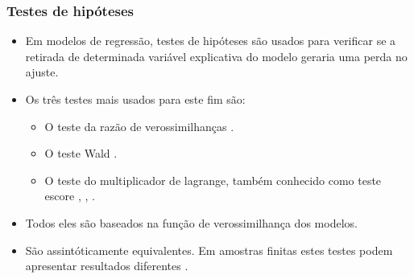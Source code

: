 \documentclass[10pt,
  aspectratio=169,
  serif,
  mathserif,
  professionalfont,
  compress,
  handout,
  ]{beamer}\usepackage[]{graphicx}\usepackage[]{color}
\begin{document}

\begin{frame}
  \frametitle{Testes de hipóteses}
  \begin{itemize}
    \itemsep 2ex
  
  \item Em modelos de regressão, testes de hipóteses são usados para verificar se a retirada de determinada variável explicativa do modelo geraria uma perda no ajuste.
  
  \item Os três testes mais usados para este fim são:

    \begin{itemize}
      \item O teste da razão de verossimilhanças \cite{trv}.
      \item O teste Wald \cite{wald}.
      \item O teste do multiplicador de lagrange, também conhecido como teste escore \cite{score1}, \cite{score2}, \cite{score3}.
    \end{itemize}
  
  \item Todos eles são baseados na função de verossimilhança dos modelos.
  
  
  \item São assintóticamente equivalentes. Em amostras finitas estes testes podem apresentar resultados diferentes \cite{conflict}.
  
  \end{itemize}
  
\end{frame}

\end{document}
